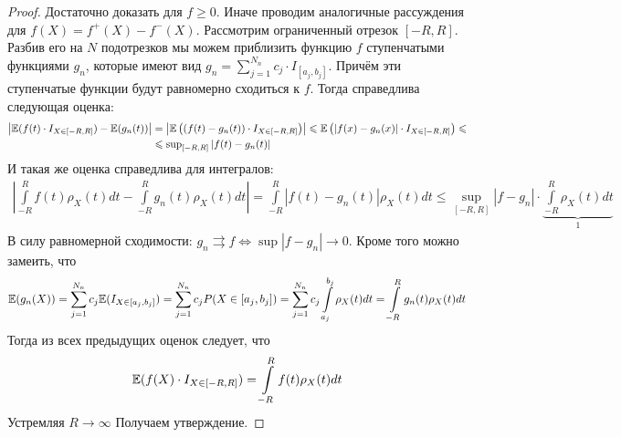 \begin{proof}
    Достаточно доказать для $f \geq 0$. Иначе проводим аналогичные рассуждения для $f(X) =f^+(X) - f^-(X)$.
    Рассмотрим ограниченный отрезок $[-R, R]$. Разбив его на $N$ подотрезков мы можем приблизить функцию $f$
    ступенчатыми функциями $g_n$, которые имеют вид $g_n = \sum\limits_{j = 1}^{N_n} c_j \cdot I_{[a_j, b_j]}$. Причём эти
    ступенчатые функции будут равномерно сходиться к $f$. Тогда справедлива следующая оценка:
    \begin{align*}
        \left| \mathbb{E}(f(t) \cdot I_{X \in [-R, R]}) - \mathbb{E}(g_n(t)) \right| &=
        \left| \mathbb{E} \left( (f(t) - g_n(t)) \cdot I_{X \in [-R, R]} \right) \right| \leqslant
        \mathbb{E} \left( \left| f(x) - g_n(x) \right| \cdot I_{X \in [-R, R]} \right) \leqslant\\
        &\leqslant \operatorname{\mathop{\mathrm{sup}}}_{[-R, R]} |f(t) - g_n(t)|
    \end{align*}
    И такая же оценка справедлива для интегралов:
    \begin{align*}
        \left|\int\limits_{-R}^{R} f(t)\rho_X(t)dt - \int\limits_{-R}^{R} g_n(t)\rho_X(t)dt\right|
        = \int\limits_{-R}^{R} |f(t) - g_n(t)|\rho_X(t)dt \leq \sup_{[-R, R]} |f - g_n| \cdot \underbrace{\int\limits_{-R}^{R} \rho_X(t)dt}_{1}
    \end{align*}
    В силу равномерной сходимости: $g_n \rightrightarrows f \iff \sup|f - g_n| \to 0$. Кроме того можно замеить, что
    \[
        \mathbb{E}(g_n(X)) = \sum\limits_{j = 1}^{N_n}c_j \mathbb{E}(I_{X \in [a_j, b_j]}) =
        \sum\limits_{j = 1}^{N_n}c_j P(X \in [a_j, b_j]) =
        \sum\limits_{j = 1}^{N_n}c_j \int\limits_{a_j}^{b_j} \rho_X(t)dt =
        \int\limits_{-R}^R g_n(t)\rho_X(t)dt
    \]
    Тогда из всех предыдущих оценок следует, что
    \[
        \mathbb{E}(f(X) \cdot I_{X \in [-R, R]}) = \int\limits_{-R}^R f(t)\rho_X(t)dt
    \]
    Устремляя $R \to \infty$ Получаем утверждение.
\end{proof}
\begin{comment}
    На мой взгляд как-то скомканно, можно посмотреть в 
    \href{https://drive.google.com/file/d/1KgHK_Z_ms3UNI4WAbLlRuI7eEYx0g4IE/view}{лекции} по таймкоду $53:00$.
\end{comment}
